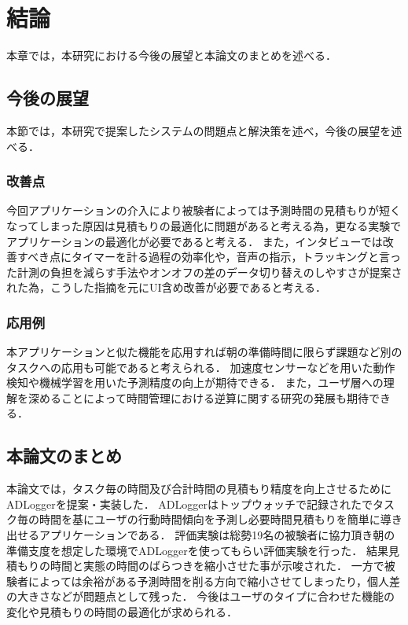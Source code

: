 \chapter{結論}
本章では，本研究における今後の展望と本論文のまとめを述べる．
\section{今後の展望}
本節では，本研究で提案したシステムの問題点と解決策を述べ，今後の展望を述べる．

\subsection{改善点}
今回アプリケーションの介入により被験者によっては予測時間の見積もりが短くなってしまった原因は見積もりの最適化に問題があると考える為，更なる実験でアプリケーションの最適化が必要であると考える．
また，インタビューでは改善すべき点にタイマーを計る過程の効率化や，音声の指示，トラッキングと言った計測の負担を減らす手法やオンオフの差のデータ切り替えのしやすさが提案された為，こうした指摘を元にUI含め改善が必要であると考える．
\subsection{応用例}
本アプリケーションと似た機能を応用すれば朝の準備時間に限らず課題など別のタスクへの応用も可能であると考えられる．
加速度センサーなどを用いた動作検知や機械学習を用いた予測精度の向上が期待できる．
また，ユーザ層への理解を深めることによって時間管理における逆算に関する研究の発展も期待できる．
\section{本論文のまとめ}
本論文では，タスク毎の時間及び合計時間の見積もり精度を向上させるためにADLoggerを提案・実装した．
ADLoggerはトップウォッチで記録されたでタスク毎の時間を基にユーザの行動時間傾向を予測し必要時間見積もりを簡単に導き出せるアプリケーションである．
評価実験は総勢19名の被験者に協力頂き朝の準備支度を想定した環境でADLoggerを使ってもらい評価実験を行った．
結果見積もりの時間と実態の時間のばらつきを縮小させた事が示唆された．
一方で被験者によっては余裕がある予測時間を削る方向で縮小させてしまったり，個人差の大きさなどが問題点として残った．
今後はユーザのタイプに合わせた機能の変化や見積もりの時間の最適化が求められる．